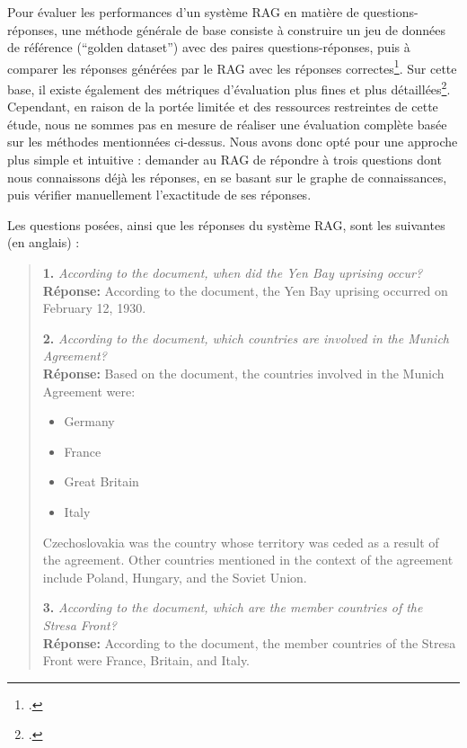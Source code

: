 \documentclass[a4paper,twoside,12pt]{book}
\begin{document}
Pour évaluer les performances d'un système RAG en matière de questions-réponses, une méthode générale de base consiste à construire un jeu de données de référence (“golden dataset”) avec des paires questions-réponses, puis à comparer les réponses générées par le RAG avec les réponses correctes\footcite{zotero-749}. Sur cette base, il existe également des métriques d'évaluation plus fines et plus détaillées\footcite{yu2025}. Cependant, en raison de la portée limitée et des ressources restreintes de cette étude, nous ne sommes pas en mesure de réaliser une évaluation complète basée sur les méthodes mentionnées ci-dessus. Nous avons donc opté pour une approche plus simple et intuitive : demander au RAG de répondre à trois questions dont nous connaissons déjà les réponses, en se basant sur le graphe de connaissances, puis vérifier manuellement l'exactitude de ses réponses.

Les questions posées, ainsi que les réponses du système RAG, sont les suivantes (en anglais) :

\begin{quote}
\textbf{1.} \textit{According to the document, when did the Yen Bay uprising occur?} \\
\textbf{Réponse:} According to the document, the Yen Bay uprising occurred on February 12, 1930.

\vspace{1em}

\textbf{2.} \textit{According to the document, which countries are involved in the Munich Agreement?} \\
\textbf{Réponse:} Based on the document, the countries involved in the Munich Agreement were:
\begin{itemize}
  \item Germany
  \item France
  \item Great Britain
  \item Italy
\end{itemize}
Czechoslovakia was the country whose territory was ceded as a result of the agreement. Other countries mentioned in the context of the agreement include Poland, Hungary, and the Soviet Union.

\vspace{1em}

\textbf{3.} \textit{According to the document, which are the member countries of the Stresa Front?} \\
\textbf{Réponse:} According to the document, the member countries of the Stresa Front were France, Britain, and Italy.
\end{quote}
\end{document}
